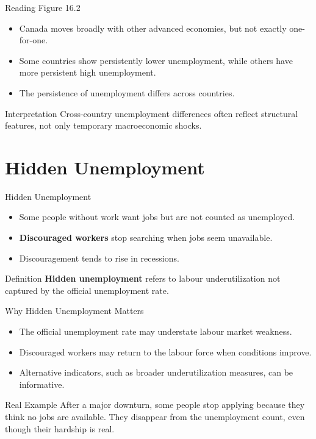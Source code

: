 \documentclass[aspectratio=169]{beamer}
\begin{document}
\begin{frame}{Reading Figure 16.2}
\transfade
\begin{itemize}[<+->]
  \item Canada moves broadly with other advanced economies, but not exactly one-for-one.
  \item Some countries show persistently lower unemployment, while others have more persistent high unemployment.
  \item The persistence of unemployment differs across countries.
\end{itemize}

\begin{block}{Interpretation}
Cross-country unemployment differences often reflect structural features, not only temporary macroeconomic shocks.
\end{block}
\end{frame}

\section{Hidden Unemployment}

\begin{frame}{Hidden Unemployment}
\transfade
\begin{itemize}[<+->]
  \item Some people without work want jobs but are not counted as unemployed.
  \item \textbf{Discouraged workers} stop searching when jobs seem unavailable.
  \item Discouragement tends to rise in recessions.
\end{itemize}

\begin{block}{Definition}
\textbf{Hidden unemployment} refers to labour underutilization not captured by the official unemployment rate.
\end{block}
\end{frame}

\begin{frame}{Why Hidden Unemployment Matters}
\transfade
\begin{itemize}[<+->]
  \item The official unemployment rate may understate labour market weakness.
  \item Discouraged workers may return to the labour force when conditions improve.
  \item Alternative indicators, such as broader underutilization measures, can be informative.
\end{itemize}

\begin{exampleblock}{Real Example}
After a major downturn, some people stop applying because they think no jobs are available. They disappear from the unemployment count, even though their hardship is real.
\end{exampleblock}
\end{frame}
\end{document}
